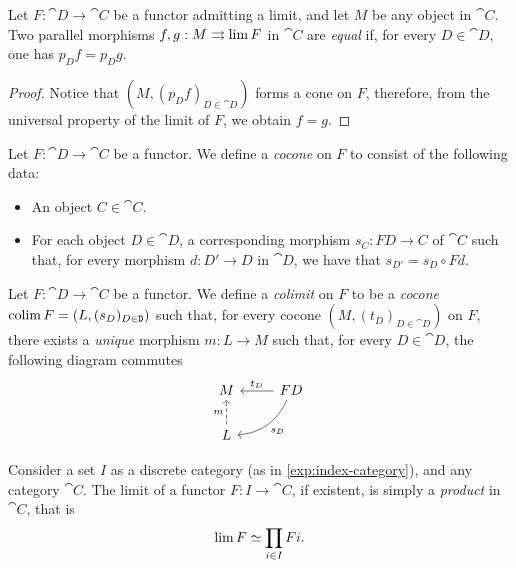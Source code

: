 \begin{proposition}
    \label{prop:equal-parallel-factorizations}
    Let \(F: \cat D \to \cat C\) be a functor admitting a limit, and let \(M\) be any
    object in \(\cat C\). Two parallel morphisms \(f, g: M \rightrightarrows \operatorname{lim} F\) in
    \(\cat C\) are \emph{equal} if, for every \(D \in \cat D\), one has
    \(p_D f = p_D g\).
\end{proposition}

\begin{proof}
    Notice that \((M, (p_D f)_{D \in \cat D})\) forms a cone on \(F\), therefore,
    from the universal property of the limit of \(F\), we obtain \(f = g\).
\end{proof}

\begin{definition}[Cocone]
    \label{def:cocone}
    Let \(F: \cat D \to \cat C\) be a functor. We define a \emph{cocone} on \(F\) to
    consist of the following data:
    \begin{itemize}\setlength\itemsep{0em}
        \item An object \(C \in \cat C\).

        \item For each object \(D \in \cat D\), a corresponding morphism \(s_C: F D \to
              C\) of \(\cat C\) such that, for every morphism \(d: D' \to D\) in \(\cat D\),
              we have that \(s_{D'} = s_D \circ F d\).
    \end{itemize}
\end{definition}

\begin{definition}[Colimit]
    \label{def:colimit}
    Let \(F: \cat D \to \cat C\) be a functor. We define a \emph{colimit} on \(F\)
    to be a \emph{cocone} \(\operatorname{colim} F = (L, (s_D)_{D \in \texttt D})\) such that, for
    every cocone \((M, (t_D)_{D \in \cat D})\) on \(F\), there exists a
    \emph{unique} morphism \(m: L \to M\) such that, for every \(D \in \cat D\), the
    following diagram commutes
    \[
        \begin{tikzcd}
            M &F D \ar[l, "t_D"'] \ar[dl, bend left, "s_D"] \\
            L \ar[u, dashed, "m"] &
        \end{tikzcd}
    \]
\end{definition}

\begin{example}[Products]
    \label{exp:product-is-limit-over-indexing-set-diagram}
    Consider a set \(I\) as a discrete category (as in \cref{exp:index-category}),
    and any category \(\cat C\). The limit of a functor \(F: I \to \cat C\), if
    existent, is simply a \emph{product} in \(\cat C\), that is
    \[
        \operatorname{lim} F \simeq \prod_{i \in I} F i.
    \]
\end{example}

